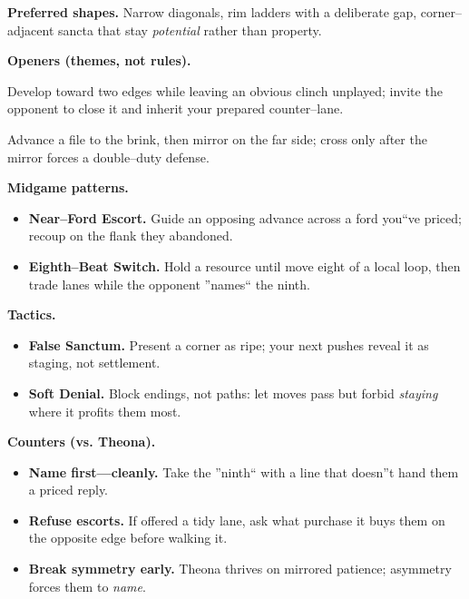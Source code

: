 \documentclass[11pt]{article}
\numberwithin{equation}{section} %
\theoremstyle{plain} %
\theoremstyle{definition} %
\theoremstyle{remark} %
\begin{document}
\medskip
\noindent\textbf{Preferred shapes.} Narrow diagonals, rim ladders with a deliberate gap, corner--adjacent sancta that stay \emph{potential} rather than property.

\medskip
\noindent\textbf{Openers (themes, not rules).}
\begin{description}\setlength\itemsep{0.35em}
  \item[\textit{Empty Chair.}] Develop toward two edges while leaving an obvious clinch unplayed; invite the opponent to close it and inherit your prepared counter--lane.
  \item[\textit{Unpoured Cup.}] Advance a file to the brink, then mirror on the far side; cross only after the mirror forces a double--duty defense.
\end{description}

\medskip
\noindent\textbf{Midgame patterns.}
\begin{itemize}\setlength\itemsep{0.25em}
  \item \textbf{Near--Ford Escort.} Guide an opposing advance across a ford you``ve priced; recoup on the flank they abandoned.
  \item \textbf{Eighth--Beat Switch.} Hold a resource until move eight of a local loop, then trade lanes while the opponent ''names`` the ninth.
\end{itemize}

\medskip
\noindent\textbf{Tactics.}
\begin{itemize}\setlength\itemsep{0.25em}
  \item \textbf{False Sanctum.} Present a corner as ripe; your next pushes reveal it as staging, not settlement.
  \item \textbf{Soft Denial.} Block endings, not paths: let moves pass but forbid \emph{staying} where it profits them most.
\end{itemize}

\medskip
\noindent\textbf{Counters (vs. Theona).}
\begin{itemize}\setlength\itemsep{0.25em}
  \item \textbf{Name first---cleanly.} Take the ''ninth`` with a line that doesn''t hand them a priced reply.
  \item \textbf{Refuse escorts.} If offered a tidy lane, ask what purchase it buys them on the opposite edge before walking it.
  \item \textbf{Break symmetry early.} Theona thrives on mirrored patience; asymmetry forces them to \emph{name}.
\end{itemize}
\end{document}
